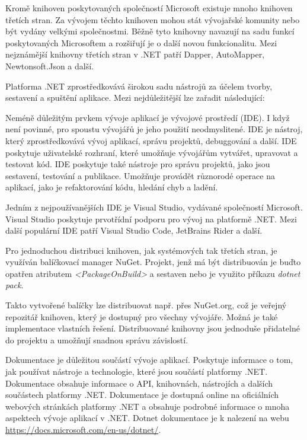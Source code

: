 Kromě knihoven poskytovaných společností Microsoft existuje mnoho knihoven třetích stran. Za vývojem těchto knihoven mohou stát vývojařské komunity nebo být vydány velkými společnostmi. Běžně tyto knihovny navazují na sadu funkcí poskytovaných Microsoftem a rozšiřují je o další novou funkcionalitu. Mezi nejznámější knihovny třetích stran v .NET patří Dapper, AutoMapper, Newtonsoft.Json a další.


Platforma .NET zprostředkovává širokou sadu nástrojů za účelem tvorby, sestavení a spuštění aplikace. Mezi nejdůležitější lze zařadit následující:


Neméně důležitým prvkem vývoje aplikací je vývojové prostředí (IDE). I když není povinné, pro spoustu vývojářů je jeho použití neodmyslitené. IDE je nástroj, který zprostředkovává vývoj aplikací, správu projektů, debuggování a další. IDE poskytuje uživatelské rozhraní, které umožňuje vývojářům vytvářet, upravovat a testovat kód. IDE poskytuje také nástroje pro správu projektů, jako jsou sestavení, testování a publikace. Umožňuje provádět různorodé operace na aplikací, jako je refaktorování kódu, hledání chyb a ladění.

Jedním z nejpoužívanějších IDE je Visual Studio, vydávané společností Microsoft. Visual Studio poskytuje prvotřídní podporu pro vývoj na platformě .NET. Mezi další populární IDE patří Visual Studio Code, JetBrains Rider a další.



Pro jednoduchou distribuci knihoven, jak systémových tak třetích stran, je využíván balíčkovací manager NuGet. Projekt, jenž má být distribuován je buďto opatřen atributem \emph{<PackageOnBuild>} a sestaven nebo je využito příkazu \emph{dotnet pack}. 

Takto vytvořené balíčky lze distribuovat např. přes NuGet.org, což je veřejný repozitář knihoven, který je dostupný pro všechny vývojáře. Možná je také implementace vlastních řešení. Distribuované knihovny jsou jednoduše přidatelné do projektu a umožňují snadnou správu závislostí.


Dokumentace je důležitou součástí vývoje aplikací. Poskytuje informace o tom, jak používat nástroje a technologie, které jsou součástí platformy .NET. Dokumentace obsahuje informace o API, knihovnách, nástrojích a dalších součástech platformy .NET. Dokumentace je dostupná online na oficiálních webových stránkách platformy .NET a obsahuje podrobné informace o mnoha aspektech vývoje aplikací v .NET. Dotnet dokumentace je k nalezení na webu \url{https://docs.microsoft.com/en-us/dotnet/}.

